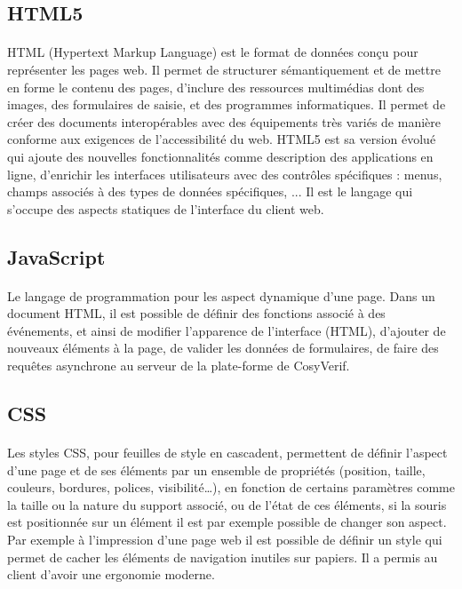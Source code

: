 \documentclass{report}
\begin{document}
\subsection*{HTML5}

\paragraph{}
HTML (Hypertext Markup Language) est le format de données conçu pour représenter les pages web. Il permet de 
structurer sémantiquement et de mettre en forme le contenu des pages, d’inclure des ressources multimédias dont des 
images, des formulaires de saisie, et des programmes informatiques. Il permet de créer des documents interopérables 
avec des équipements très variés de manière conforme aux exigences de l’accessibilité du web. HTML5 est sa version
évolué qui ajoute des nouvelles fonctionnalités comme description des applications en ligne, d'enrichir les interfaces
utilisateurs avec des contrôles spécifiques : menus, champs associés à des types de données spécifiques, ... Il est le
langage qui s'occupe des aspects statiques de l'interface du client web.


\subsection*{JavaScript}

\paragraph{}
Le langage de programmation pour les aspect dynamique d'une page. Dans un document HTML, il est possible de définir 
des fonctions associé à des événements, et ainsi de modifier l’apparence de l'interface (HTML), d'ajouter de nouveaux 
éléments à la page, de valider les données de formulaires, de faire des requêtes asynchrone au serveur de la plate-forme
de CosyVerif.

\subsection*{CSS}

\paragraph{}
Les styles CSS, pour feuilles de style en cascadent, permettent de définir l’aspect d'une page et de ses éléments par un 
ensemble de propriétés (position, taille, couleurs, bordures, polices, visibilité…), en fonction de certains paramètres 
comme la taille ou la nature du support associé, ou de l'état de ces éléments, si la souris est positionnée sur un élément 
il est par exemple possible de changer son aspect. Par exemple à l'impression d'une page web il est possible de définir 
un style qui permet de cacher les éléments de navigation inutiles sur papiers. Il a permis au client d'avoir une ergonomie
moderne.
\end{document}
